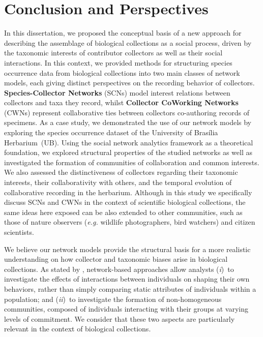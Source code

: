 \chapter{Conclusion and Perspectives}\label{conclusion_perspectives}
In this dissertation, we proposed the conceptual basis of a new approach for describing the assemblage of biological collections as a social process, driven by the taxonomic interests of contributor collectors as well as their social interactions.
In this context, we provided methods for structuring species occurrence data from biological collections into two main classes of network models, each giving distinct perspectives on the recording behavior of collectors.
\textbf{Species-Collector Networks} (SCNs) model interest relations between collectors and taxa they record, whilst \textbf{Collector CoWorking Networks} (CWNs) represent collaborative ties between collectors co-authoring records of specimens. 
As a case study, we demonstrated the use of our network models by exploring the species occurrence dataset of the University of Brasília Herbarium~(UB).
Using the social network analytics framework \cite{Barbier2011,Stork2015} as a theoretical foundation, we explored structural properties of the studied networks as well as 
investigated the formation of communities of collaboration and common interests.
We also assessed the distinctiveness of collectors regarding their taxonomic interests, their collaborativity with others, and the temporal evolution of collaborative recording in the herbarium.
Although in this study we specifically discuss SCNs and CWNs in the context of scientific biological collections, the same ideas here exposed can be also extended to other communities, such as those of nature observers (\textit{e.g.} wildlife photographers, bird watchers) and citizen scientists.

We believe our network models provide the structural basis for a more realistic understanding on how collector and taxonomic biases arise in biological collections. 
As stated by , network-based approaches allow analysts 
(\textit{i})~to investigate the effects of interactions between individuals on shaping their own behaviors, rather than simply comparing static attributes of individuals within a population; and
(\textit{ii})~to investigate the formation of non-homogeneous communities, composed of individuals interacting with their groups at varying levels of commitment.
We consider that these two aspects are particularly relevant in the context of biological collections.

